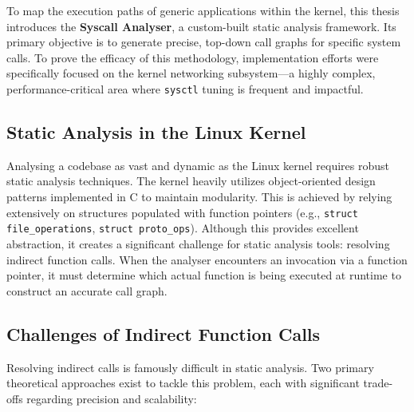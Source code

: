 To map the execution paths of generic applications within the kernel, this thesis introduces the \textbf{Syscall Analyser}, a custom-built static analysis framework.
Its primary objective is to generate precise, top-down call graphs for specific system calls.
To prove the efficacy of this methodology, implementation efforts were specifically focused on the kernel networking subsystem—a highly complex, performance-critical area where \texttt{sysctl} tuning is frequent and impactful.

\subsection{Static Analysis in the Linux Kernel}

Analysing a codebase as vast and dynamic as the Linux kernel requires robust static analysis techniques.
The kernel heavily utilizes object-oriented design patterns implemented in C to maintain modularity.
This is achieved by relying extensively on structures populated with function pointers (e.g., \texttt{struct file\_operations}, \texttt{struct proto\_ops}).
Although this provides excellent abstraction, it creates a significant challenge for static analysis tools: resolving indirect function calls.
When the analyser encounters an invocation via a function pointer, it must determine which actual function is being executed at runtime to construct an accurate call graph.

\subsection{Challenges of Indirect Function Calls}

Resolving indirect calls is famously difficult in static analysis.
Two primary theoretical approaches exist to tackle this problem, each with significant trade-offs regarding precision and scalability:

